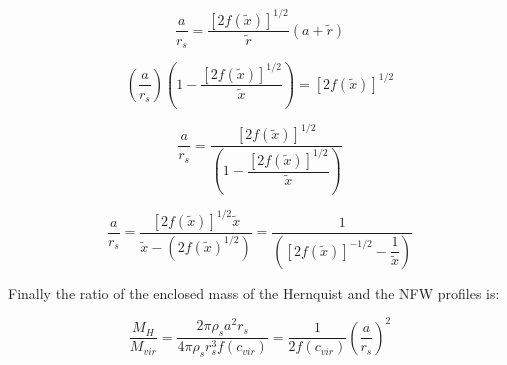 \begin{equation}
\dfrac{a}{r_s} = \dfrac{[2 f(\tilde{x})]^{1/2}}{\tilde{r}} (a + \tilde{r})
\end{equation}

\begin{equation}
\left( \dfrac{a}{r_s} \right) \left( 1 -  \dfrac{[2 f(\tilde{x})]^{1/2}}{\tilde{x}} \right) = [2 f(\tilde{x})]^{1/2} 
\end{equation}

\begin{equation}
\dfrac{a}{r_s} = \dfrac{[2 f(\tilde{x})]^{1/2}}{ \left( 1 -  \dfrac{[2 f(\tilde{x})]^{1/2}}{\tilde{x}} \right)}
\end{equation}

\begin{equation}
\dfrac{a}{r_s} = \dfrac{[2 f(\tilde{x})]^{1/2} \tilde{x}}{\tilde{x} - (2f(\tilde{x})^{1/2})} = \dfrac{1}{\left(  [2 f(\tilde{x})]^{-1/2} - \dfrac{1}{\tilde{x}}  \right)}
\end{equation}

Finally the ratio of the enclosed mass of the Hernquist and the NFW profiles is:

\begin{equation}
\dfrac{M_H}{M_{vir}} = \dfrac{2 \pi \rho_s a^2 r_s}{4 \pi \rho_s r_s^3 f(c_{vir})} = \dfrac{1}{2 f(c_{vir})}  \left( \dfrac{a}{r_s}\right)^2
\end{equation}


